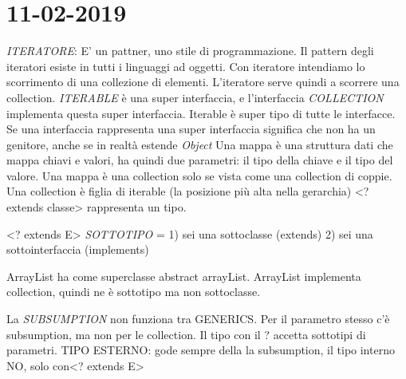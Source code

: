 

\newpage
\section{11-02-2019}
\par

\textit{ITERATORE}: E' un pattner, uno stile di programmazione. Il pattern degli iteratori esiste in tutti i linguaggi ad oggetti. Con iteratore intendiamo lo scorrimento di una collezione di elementi. L'iteratore serve quindi a scorrere una collection.\newline
\textit{ITERABLE} è una super interfaccia, e l'interfaccia \textit{COLLECTION} implementa questa super interfaccia. Iterable è super tipo di tutte le interfacce. \newline
Se una interfaccia rappresenta una super interfaccia significa che non ha un genitore, anche se in realtà estende \textit{Object}
\newline
Una mappa è una struttura dati che mappa chiavi e valori, ha quindi due parametri: il tipo della chiave e il tipo del valore. Una mappa è una collection solo se vista come una collection di coppie. \newline
Una collection è figlia di iterable (la posizione più alta nella gerarchia)\newline
<? extends classe> rappresenta un tipo. \newline

<? extends E> \newline
\textit{SOTTOTIPO} = 1) sei una sottoclasse (extends) 2) sei una sottointerfaccia (implements)
\newline


ArrayList ha come superclasse abstract arrayList. ArrayList implementa collection, quindi ne è sottotipo ma non sottoclasse.
\newline


La \textit{SUBSUMPTION} non funziona tra GENERICS. Per il parametro stesso c'è subsumption, ma non per le collection. Il tipo con
 il ? accetta sottotipi di parametri.
\newline
TIPO ESTERNO: gode sempre della la subsumption, il tipo interno NO, solo con<? extends E>  \newline

